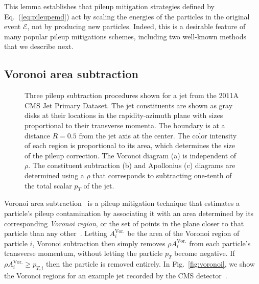 \documentclass[letterpaper,11pt]{article}
\DeclareRobustCommand{\Fig}[1]{Fig.~\ref{#1}}
\DeclareRobustCommand{\Eq}[1]{Eq.~(\ref{#1})}
\begin{document}
This lemma establishes that pileup mitigation strategies defined by \Eq{eq:pileupemd} act by scaling the energies of the particles in the original event $\mathcal{E}$, not by producing new particles.
%
Indeed, this is a desirable feature of many popular pileup mitigations schemes, including two well-known methods that we describe next.


\subsection{Voronoi area subtraction}
\label{sec:voronoi}


\begin{figure}[t]
\centering
{}
\caption{
\label{fig:pileupexample}
Three pileup subtraction procedures shown for a jet from the 2011A CMS Jet Primary Dataset.
%
The jet constituents are shown as gray disks at their locations in the rapidity-azimuth plane with sizes proportional to their transverse momenta.
%
The boundary is at a distance $R=0.5$ from the jet axis at the center.
%
The color intensity of each region is proportional to its area, which determines the size of the pileup correction.
%
The Voronoi diagram (a) is independent of $\rho$.
%
The constituent subtraction (b) and Apollonius (c) diagrams are determined using a $\rho$ that corresponds to subtracting one-tenth of the total scalar $p_T$ of the jet.
}
\end{figure}


Voronoi area subtraction~\cite{Cacciari:2007fd,Cacciari:2008gn,Cacciari:2011ma} is a pileup mitigation technique that estimates a particle's pileup contamination by associating it with an area determined by its corresponding \emph{Voronoi region}, or the set of points in the plane closer to that particle than any other~\cite{Aurenhammer2013:book}.
%
Letting $A_i^\text{Vor.}$ be the area of the Voronoi region of particle $i$, Voronoi subtraction then simply removes $\rho A_i^\text{Vor.}$ from each particle's transverse momentum, without letting the particle $p_T$ become negative.
%
If $\rho A_i^\text{Vor.}\ge p_{T,i}$ then the particle is removed entirely.
%
In \Fig{fig:voronoi}, we show the Voronoi regions for an example jet recorded by the CMS detector~\cite{CMS:JetPrimary2011A,Komiske:2019jim}.
\end{document}
